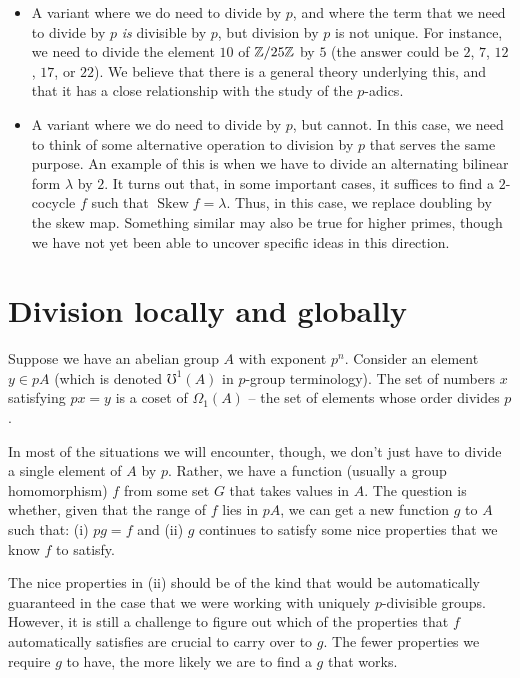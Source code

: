 \documentclass[10pt]{amsart}
\newcommand{\Skew}{\operatorname{Skew}}
\begin{document}
\begin{itemize}
\item A variant where we do need to divide by $p$, and where the term
  that we need to divide by $p$ {\em is} divisible by $p$, but
  division by $p$ is not unique. For instance, we need to divide the
  element $10$ of $\mathbb{Z}/25\mathbb{Z}$ by $5$ (the answer could be $2$, $7$,
  $12$, $17$, or $22$). We believe that there is a general theory
  underlying this, and that it has a close relationship with the study
  of the $p$-adics.
\item A variant where we do need to divide by $p$, but cannot. In this
  case, we need to think of some alternative operation to division by
  $p$ that serves the same purpose. An example of this is when we have
  to divide an alternating bilinear form $\lambda$ by $2$. It turns
  out that, in some important cases, it suffices to find a $2$-cocycle
  $f$ such that $\Skew f = \lambda$. Thus, in this case, we replace
  doubling by the skew map. Something similar may also be true for
  higher primes, though we have not yet been able to uncover specific
  ideas in this direction.
\end{itemize}

\section*{Division locally and globally}

Suppose we have an abelian group $A$ with exponent $p^n$. Consider an
element $y \in pA$ (which is denoted $\mho^1(A)$ in $p$-group
terminology). The set of numbers $x$ satisfying $px = y$ is a coset of
$\Omega_1(A)$ -- the set of elements whose order divides $p$.

In most of the situations we will encounter, though, we don't just
have to divide a single element of $A$ by $p$. Rather, we have a
function (usually a group homomorphism) $f$ from some set $G$ that
takes values in $A$. The question is whether, given that the range of
$f$ lies in $pA$, we can get a new function $g$ to $A$ such that: (i)
$pg = f$ and (ii) $g$ continues to satisfy some nice properties that
we know $f$ to satisfy. 

The nice properties in (ii) should be of the kind that would be
automatically guaranteed in the case that we were working with
uniquely $p$-divisible groups. However, it is still a challenge to
figure out which of the properties that $f$ automatically satisfies
are crucial to carry over to $g$. The fewer properties we require $g$
to have, the more likely we are to find a $g$ that works.
\end{document}
